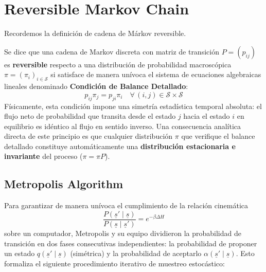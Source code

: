 \documentclass[10pt]{book}
\begin{document}
\section{Reversible Markov Chain}
Recordemos la definición de cadena de Márkov reversible.
\begin{definicion}
    Se dice que una cadena de Markov discreta con matriz de transición $P = (p_{ij})$ es \textbf{reversible} respecto a una distribución de probabilidad macroscópica $\pi = (\pi_i)_{i \in \mathcal{S}}$ si satisface de manera unívoca el sistema de ecuaciones algebraicas lineales denominado \textbf{Condición de Balance Detallado}:
    \[
    p_{ij} \pi_j = p_{ji} \pi_i \quad \forall \, (i,j) \in \mathcal{S} \times \mathcal{S}
    \]
    Físicamente, esta condición impone una simetría estadística temporal absoluta: el flujo neto de probabilidad que transita desde el estado $j$ hacia el estado $i$ en equilibrio es idéntico al flujo en sentido inverso. Una consecuencia analítica directa de este principio es que cualquier distribución $\pi$ que verifique el balance detallado constituye automáticamente una \textbf{distribución estacionaria e invariante} del proceso ($\pi = \pi P$).
\end{definicion}


\subsection{Metropolis Algorithm}

\noindent 
Para garantizar de manera unívoca el cumplimiento de la relación cinemática 
$$\frac{P(\underline{s}' \mid \underline{s})}{P(\underline{s} \mid \underline{s}')} = e^{-\beta \Delta H}$$ 
sobre un computador, Metropolis y su equipo dividieron la probabilidad de transición en dos fases consecutivas independientes: la probabilidad de proponer un estado $q(\underline{s}' \mid \underline{s})$ (simétrica) y la probabilidad de aceptarlo $\alpha(\underline{s}' \mid \underline{s})$. Esto formaliza el siguiente procedimiento iterativo de muestreo estocástico:
\end{document}
